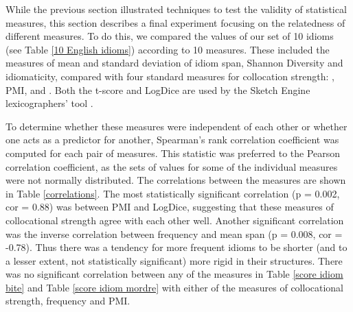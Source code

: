 \documentclass[output=paper]{langsci/langscibook}
\begin{document}
While the previous section illustrated techniques to test the validity
of statistical measures, this section describes a final experiment
focusing on the relatedness of different measures. To do this, we
compared the values of our set of 10 idioms (see Table \ref{10 English idioms}) according to
10 measures. These included the measures of mean and standard deviation
of idiom span, Shannon Diversity and idiomaticity, compared with four
standard measures for collocation strength: ,
PMI,  and . Both the t-score and LogDice are used by the
Sketch Engine lexicographers’ tool \citep{rychly2008}. 



To determine whether these measures were independent of each other or \linebreak
whether one acts as a predictor for another, Spearman’s rank
correlation coefficient was computed for each pair of measures. This
statistic was preferred to the Pearson correlation coefficient, as the
sets of values for some of the individual measures were not normally
distributed. The correlations between the measures are shown in Table
\ref{correlations}. The most statistically significant correlation (p = 0.002, cor =
0.88) was between PMI and LogDice, suggesting that these measures of
collocational strength agree with each other well. Another significant
correlation was the inverse correlation between frequency and mean span
(p = 0.008, cor = -0.78). Thus there was a tendency for more frequent
idioms to be shorter (and to a lesser extent, not statistically
significant) more rigid in their structures. There was no significant
correlation between any of the measures in Table \ref{score idiom bite} and Table \ref{score idiom mordre} with either
of the measures of collocational strength, frequency and PMI.
\end{document}
